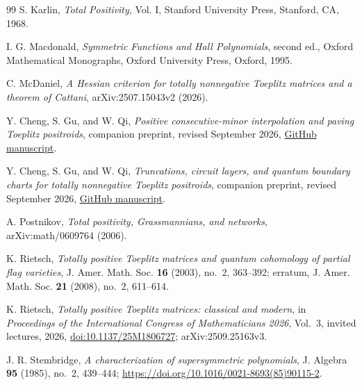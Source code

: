 \documentclass{amsart}
\numberwithin{equation}{section}
\theoremstyle{definition}
\theoremstyle{remark}
\begin{document}
\begin{thebibliography}{99}
S. Karlin,
\emph{Total Positivity}, Vol. I,
Stanford University Press, Stanford, CA, 1968.

I. G. Macdonald,
\emph{Symmetric Functions and Hall Polynomials}, second ed.,
Oxford Mathematical Monographs, Oxford University Press, Oxford, 1995.

C. McDaniel,
\emph{A Hessian criterion for totally nonnegative Toeplitz matrices and a theorem of Cattani},
arXiv:2507.15043v2 (2026).

Y. Cheng, S. Gu, and W. Qi,
\emph{Positive consecutive-minor interpolation and paving Toeplitz positroids},
companion preprint, revised September 2026,
\href{https://raw.githubusercontent.com/Cheng-Yaoyu/paving-toeplitz-positroids-formalization/main/paper/positive_consecutive_minor_interpolation_and_paving_toeplitz_positroids.pdf}{GitHub manuscript}.

Y. Cheng, S. Gu, and W. Qi,
\emph{Truncations, circuit layers, and quantum boundary charts for totally nonnegative Toeplitz positroids},
companion preprint, revised September 2026,
\href{https://raw.githubusercontent.com/Cheng-Yaoyu/toeplitz-positroids-truncations-boundary-charts-formalization/main/paper/toeplitz_positroids_truncations_boundary_charts.pdf}{GitHub manuscript}.

A. Postnikov,
\emph{Total positivity, Grassmannians, and networks},
arXiv:math/0609764 (2006).

K. Rietsch,
\emph{Totally positive Toeplitz matrices and quantum cohomology of partial flag varieties},
J. Amer. Math. Soc. \textbf{16} (2003), no.~2, 363--392;
erratum, J. Amer. Math. Soc. \textbf{21} (2008), no.~2, 611--614.

K. Rietsch,
\emph{Totally positive Toeplitz matrices: classical and modern},
in \emph{Proceedings of the International Congress of Mathematicians 2026},
Vol.~3, invited lectures, 2026,
\href{https://doi.org/10.1137/25M1806727}{doi:10.1137/25M1806727};
arXiv:2509.25163v3.

J. R. Stembridge,
\emph{A characterization of supersymmetric polynomials},
J. Algebra \textbf{95} (1985), no.~2, 439--444;
\url{https://doi.org/10.1016/0021-8693(85)90115-2}.

\end{thebibliography}
\end{document}
